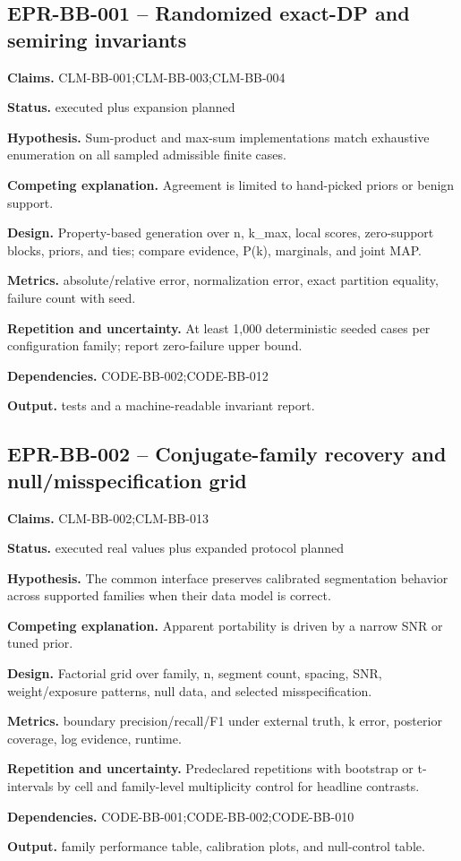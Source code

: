 \subsection{EPR-BB-001 -- Randomized exact-DP and semiring invariants}
\textbf{Claims.} CLM-BB-001;CLM-BB-003;CLM-BB-004\par
\textbf{Status.} executed plus expansion planned\par
\textbf{Hypothesis.} Sum-product and max-sum implementations match exhaustive enumeration on all sampled admissible finite cases.\par
\textbf{Competing explanation.} Agreement is limited to hand-picked priors or benign support.\par
\textbf{Design.} Property-based generation over n, k\_max, local scores, zero-support blocks, priors, and ties; compare evidence, P(k), marginals, and joint MAP.\par
\textbf{Metrics.} absolute/relative error, normalization error, exact partition equality, failure count with seed.\par
\textbf{Repetition and uncertainty.} At least 1,000 deterministic seeded cases per configuration family; report zero-failure upper bound.\par
\textbf{Dependencies.} CODE-BB-002;CODE-BB-012\par
\textbf{Output.} tests and a machine-readable invariant report.

\subsection{EPR-BB-002 -- Conjugate-family recovery and null/misspecification grid}
\textbf{Claims.} CLM-BB-002;CLM-BB-013\par
\textbf{Status.} executed real values plus expanded protocol planned\par
\textbf{Hypothesis.} The common interface preserves calibrated segmentation behavior across supported families when their data model is correct.\par
\textbf{Competing explanation.} Apparent portability is driven by a narrow SNR or tuned prior.\par
\textbf{Design.} Factorial grid over family, n, segment count, spacing, SNR, weight/exposure patterns, null data, and selected misspecification.\par
\textbf{Metrics.} boundary precision/recall/F1 under external truth, k error, posterior coverage, log evidence, runtime.\par
\textbf{Repetition and uncertainty.} Predeclared repetitions with bootstrap or t-intervals by cell and family-level multiplicity control for headline contrasts.\par
\textbf{Dependencies.} CODE-BB-001;CODE-BB-002;CODE-BB-010\par
\textbf{Output.} family performance table, calibration plots, and null-control table.

